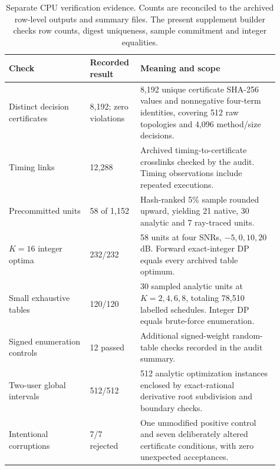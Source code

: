 \begin{table}[htbp]
\centering\small
\caption{Separate CPU verification evidence. Counts are reconciled to the archived
row-level outputs and summary files. The present supplement builder checks
row counts, digest uniqueness, sample commitment and integer equalities.}
\label{supp:table10}
\begin{tabular}{p{0.28\linewidth}p{0.15\linewidth}p{0.48\linewidth}}
\hline
Check & Recorded result & Meaning and scope\\
\hline
Distinct decision certificates &8,192; zero violations&8,192 unique certificate SHA-256 values and nonnegative four-term identities, covering 512 raw topologies and 4,096 method/size decisions.\\
Timing links &12,288&Archived timing-to-certificate crosslinks checked by the audit. Timing observations include repeated executions.\\
Precommitted units &58 of 1,152&Hash-ranked 5\% sample rounded upward, yielding 21 native, 30 analytic and 7 ray-traced units.\\
$K=16$ integer optima &232/232&58 units at four SNRs, $-5,0,10,20$ dB. Forward exact-integer DP equals every archived table optimum.\\
Small exhaustive tables &120/120&30 sampled analytic units at $K=2,4,6,8$, totaling 78,510 labelled schedules. Integer DP equals brute-force enumeration.\\
Signed enumeration controls &12 passed&Additional signed-weight random-table checks recorded in the audit summary.\\
Two-user global intervals &512/512&512 analytic optimization instances enclosed by exact-rational derivative root subdivision and boundary checks.\\
Intentional corruptions &7/7 rejected&One unmodified positive control and seven deliberately altered certificate conditions, with zero unexpected acceptances.\\
\hline
\end{tabular}
\end{table}
